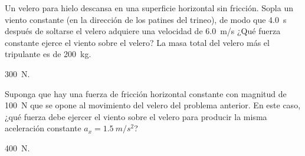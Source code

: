 \documentclass[11pt]{article}
\begin{document}
\begin{multicols}{2}
\begin{exercise}
    Un velero para hielo descansa en una superficie horizontal sin fricción. Sopla un viento constante (en la dirección de los patines del trineo), de modo que \qty{4.0}{s} después de soltarse el velero adquiere una velocidad de \qty{6.0}{m/s} ¿Qué fuerza constante ejerce el viento sobre el velero? La masa total del velero más el tripulante es de \qty{200}{kg}.
\end{exercise}
\begin{solution}
    \qty{300}{N}.
\end{solution}
\end{multicols}

\begin{multicols}{2}
\begin{exercise}
    Suponga que hay una fuerza de fricción horizontal constante con magnitud de \qty{100}{N} que se opone al movimiento del velero del problema anterior. En este caso, ¿qué fuerza debe ejercer el viento sobre el velero para producir la misma aceleración constante $a_x = \qty{1.5}{m/s^2}$?
\end{exercise}
\begin{solution}
    \qty{400}{N}.
\end{solution}
\end{multicols}
\end{document}
